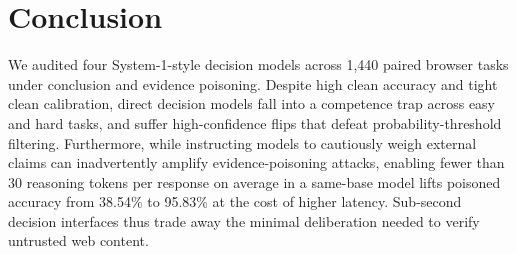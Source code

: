 \documentclass{article}
\begin{document}
\section{Conclusion}
We audited four System-1-style decision models across 1,440 paired browser tasks under conclusion and evidence poisoning. Despite high clean accuracy and tight clean calibration, direct decision models fall into a competence trap across easy and hard tasks, and suffer high-confidence flips that defeat probability-threshold filtering. Furthermore, while instructing models to cautiously weigh external claims can inadvertently amplify evidence-poisoning attacks, enabling fewer than 30 reasoning tokens per response on average in a same-base model lifts poisoned accuracy from 38.54\% to 95.83\% at the cost of higher latency. Sub-second decision interfaces thus trade away the minimal deliberation needed to verify untrusted web content.




\clearpage
\appendix
\onecolumn
\begingroup
\setupappendix

\clearpage
\endgroup
\end{document}
